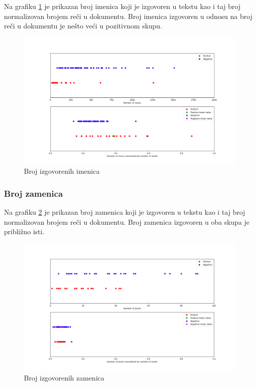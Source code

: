 \documentclass[12pt,oneside]{memoir}
\begin{document}
Na grafiku \ref{img:imenice} je prikazan broj imenica koji je izgovoren u tekstu kao i taj broj normalizovan brojem reči u dokumentu.  Broj imenica izgovoren u odnosu na broj reči u dokumentu je nešto veći u pozitivnom skupu.  

\begin{figure}[h!]
\centering
\includegraphics[width=.9\textwidth]{images/imenice.png}
\caption{ Broj izgovorenih imenica  }
\label{img:imenice}
\end{figure}

\FloatBarrier

\subsubsection{Broj zamenica}

Na grafiku \ref{img:zamenice} je prikazan broj zamenica koji je izgovoren u tekstu kao i taj broj normalizovan brojem reči u dokumentu.  Broj zamenica izgovoren u oba skupa je približno isti.  

\begin{figure}[h!]
\centering
\includegraphics[width=.9\textwidth]{images/zamenice.png}
\caption{ Broj izgovorenih zamenica }
\label{img:zamenice}
\end{figure}
\end{document}
